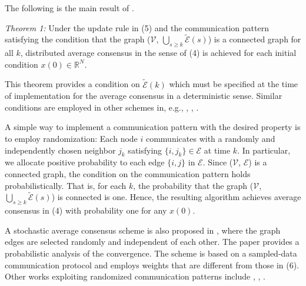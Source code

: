 \documentclass[12pt]{article}
\begin{document}
			The following is the main result of \cite{bib28}.
			\par
			\textit{Theorem 1:} Under the update rule in (5) and the communication pattern satisfying the condition that the graph ($\mathscr{V}$, $\bigcup_{s \geq k} \tilde{\mathscr{E}}(s)$) is a connected graph for all $k$, distributed average consensus in the sense of (4) is achieved for each initial condition $x(0) \in \mathbb{R}^N$. 
			\par
			This theorem provides a condition on $\tilde{\mathscr{E}}(k)$ which must be specified at the time of implementation for the average consensus in a deterministic sense. Similar conditions are employed in other schemes in, e.g., \cite{bib05}, \cite{bib12}, \cite{bib16}. 
			\par
			A simple way to implement a communication pattern with the desired property is to employ randomization: Each node $i$ communicates with a randomly and independently chosen neighbor $j_k$ satisfying $\{i, j_k\} \in \mathscr{E}$ at time $k$. In particular, we allocate positive probability to each edge $\{i, j\}$ in $\mathscr{E}$. Since ($\mathscr{V}$, $\mathscr{E}$) is a connected graph, the condition on the communication pattern holds probabilistically. That is, for each $k$, the probability that the graph ($\mathscr{V}$, $\bigcup_{s \geq k} \tilde{\mathscr{E}}(s)$) is connected is one. Hence, the resulting algorithm achieves average consensus in (4) with probability one for any $x(0)$. 
			\par
			A stochastic average consensus scheme is also proposed in \cite{bib10}, where the graph edges are selected randomly and independent of each other. The paper provides a probabilistic analysis of the convergence. The scheme is based on a sampled-data communication protocol and employs weights that are different from those in (6). Other works exploiting randomized communication patterns include \cite{bib07}, \cite{bib21}, \cite{bib27}.
\end{document}
